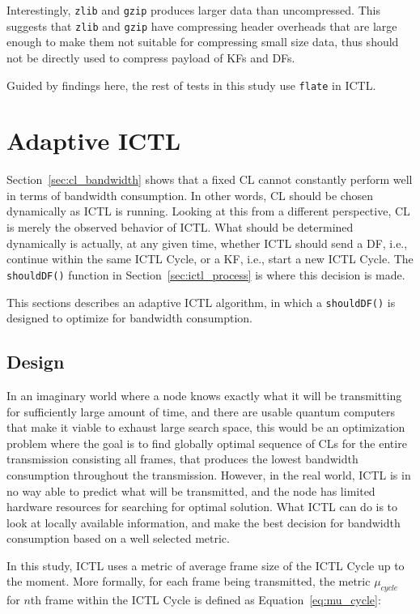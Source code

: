 \documentclass[12pt]{report}
\begin{document}
Interestingly, \texttt{zlib} and \texttt{gzip} produces larger data than uncompressed. This suggests that \texttt{zlib} and \texttt{gzip} have compressing header overheads that are large enough to make them not suitable for compressing small size data, thus should not be directly used to compress payload of KFs and DFs.

Guided by findings here, the rest of tests in this study use \texttt{flate} in ICTL.

\section{Adaptive ICTL}
\label{sec:adaptive_ictl}

Section~\ref{sec:cl_bandwidth} shows that a fixed CL cannot constantly perform well in terms of bandwidth consumption. In other words, CL should be chosen dynamically as ICTL is running. Looking at this from a different perspective, CL is merely the observed behavior of ICTL. What should be determined dynamically is actually, at any given time, whether ICTL should send a DF, i.e., continue within the same ICTL Cycle, or a KF, i.e., start a new ICTL Cycle. The \texttt{shouldDF()} function in Section~\ref{sec:ictl_process} is where this decision is made.

This sections describes an adaptive ICTL algorithm, in which a \texttt{shouldDF()} is designed to optimize for bandwidth consumption.

\subsection{Design}

In an imaginary world where a node knows exactly what it will be transmitting for sufficiently large amount of time, and there are usable quantum computers that make it viable to exhaust large search space, this would be an optimization problem where the goal is to find globally optimal sequence of CLs for the entire transmission consisting all frames, that produces the lowest bandwidth consumption throughout the transmission. However, in the real world, ICTL is in no way able to predict what will be transmitted, and the node has limited hardware resources for searching for optimal solution. What ICTL can do is to look at locally available information, and make the best decision for bandwidth consumption based on a well selected metric. 

In this study, ICTL uses a metric of average frame size of the ICTL Cycle up to the moment. More formally, for each frame being transmitted, the metric $\mu_{cycle}$ for $n$th frame within the ICTL Cycle is defined as Equation~\ref{eq:mu_cycle}:
\end{document}
